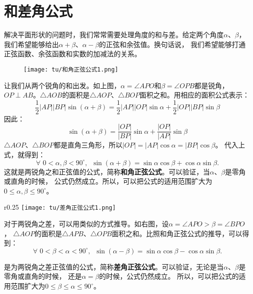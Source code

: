 \documentclass[12pt,UTF8]{ctexbook}
\begin{document}
\section{和差角公式}

解决平面形状的问题时，我们常常需要处理角度的和与差。给定两个角度$\alpha$、$\beta$，
我们希望能够给出$\alpha + \beta$、$\alpha - \beta$的正弦和余弦值。换句话说，
我们希望能够打通正弦函数、余弦函数和实数的加减法的关系。

\begin{figure}[H] %
    \vspace{4pt}
    \centering
    \texttt{[image: tu/和角正弦公式1.png]}
\end{figure}

让我们从两个锐角的和出发。如上图，$\alpha = \angle APO$和$\beta = \angle OPB$都是锐角，
$OP \perp AB$。$\triangle AOB$的面积是$\triangle AOP$、$\triangle BOP$面积之和。用相应的面积公式表示：
$$ \frac12 |AP||BP|\sin(\alpha + \beta) = \frac12 |AP||OP|\sin\alpha + \frac12 |OP||BP|\sin\beta$$
因此：
$$ \sin(\alpha + \beta) = \frac{|OP|}{|BP|}\sin\alpha + \frac{|OP|}{|AP|}\sin\beta$$
$\triangle AOP$、$\triangle BOP$都是直角三角形，所以$|OP| = |AP|\cos \alpha = |BP|\cos \beta$。
代入上式，就得到：
$$ \forall \,\, 0 < \alpha, \beta < 90^\circ , \,\,\, \sin(\alpha + \beta) = \sin\alpha \cos \beta + \cos \alpha \sin\beta.$$
这就是两锐角之和正弦值的公式，简称\textbf{和角正弦公式}。可以验证，当$\alpha$、$\beta$是零角或直角的时候，
公式仍然成立。所以，可以把公式的适用范围扩大为$0 \leqslant \alpha , \beta \leqslant 90^\circ$。

\begin{wrapfigure}[7]{r}{0.25\textwidth} %
    \vspace{-45pt}
    \flushright
    \texttt{[image: tu/差角正弦公式1.png]}
\end{wrapfigure}

对于两锐角之差，可以用类似的方式推导。如右图，设$\alpha = \angle APO > \beta = \angle BPO$，
$\triangle AOP$的面积是$\triangle APB$、$\triangle OPB$面积之和。比照和角正弦公式的推导，可以得到：
$$ \forall \,\, 0 <  \beta < \alpha < 90^\circ , \,\,\, \sin(\alpha - \beta) = \sin\alpha \cos \beta - \cos \alpha \sin\beta.$$

是为两锐角之差正弦值的公式，简称\textbf{差角正弦公式}。可以验证，无论是当$\alpha$、$\beta$是零角或直角的时候，
还是$\alpha = \beta$的时候，公式仍然成立。
所以，可以把公式的适用范围扩大为$0 \leqslant \beta \leqslant \alpha \leqslant 90^\circ$。
\end{document}

